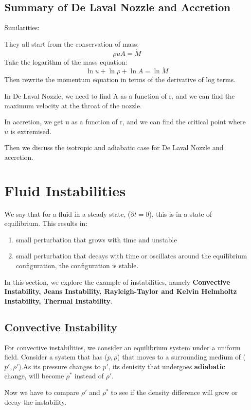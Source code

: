 \documentclass[12pt,a4paper]{article}
\begin{document}
    \subsection{Summary of De Laval Nozzle and Accretion}
    Similarities:

    They all start from the conservation of mass:
    $$
    \rho u A = \dot{M}
    $$
    Take the logarithm of the mass equation:
    $$
    \ln u + \ln \rho + \ln A = \ln \dot{M}
    $$
    Then rewrite the momentum equation in terms of the derivative of log terms.

    In De Laval Nozzle, we need to find A as a function of r, and we can find the maximum velocity at the throat of the nozzle.

    In accretion, we get u as a function of r, and we can find the critical point where $u$ is extremised.

    Then we discuss the isotropic and adiabatic case for De Laval Nozzle and accretion.

\section{Fluid Instabilities}
We say that for a fluid in a steady state, ($\partial{t} = 0$), this is in a state of equilibrium. This results in:
\begin{enumerate}
    \item small perturbation that grows with time and unstable
    \item small perturbation that decays with time or oscillates around the equilibrium configuration, the configuration is stable.
\end{enumerate}
In this section, we explore the example of instabilities, namely \textbf{Convective Instability, Jeans Instability, Rayleigh-Taylor and Kelvin Helmholtz Instability, Thermal Instability}.
\subsection{Convective Instability}
For convective instabilities, we consider an equilibrium system under a uniform field.
Consider a system that has ($p,\rho$) that moves to a surrounding medium of ($p',\rho'$).As its pressure changes to $p'$, its denisity that undergoes \textbf{adiabatic} change, will become $\rho^{*}$ instead of $\rho'$.

Now we have to compare $\rho'$ and $\rho^{*}$ to see if the density difference will grow or decay the instability.
\end{document}
